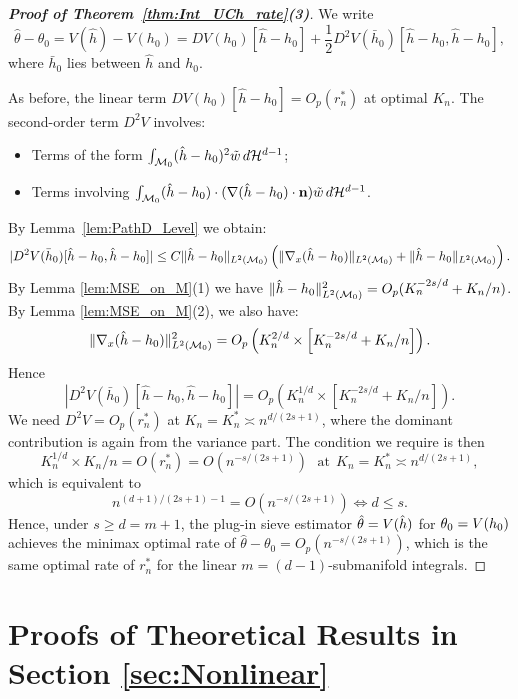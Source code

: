 \documentclass[12pt,american]{article}
\newcommand{\cH}{\mathcal{H}}
\theoremstyle{definition}
\theoremstyle{plain}
\theoremstyle{definition}
\theoremstyle{plain}
\theoremstyle{plain}
\theoremstyle{plain}
\theoremstyle{plain}
\theoremstyle{plain}
\begin{document}
\begin{proof}[\textbf{Proof of Theorem~\ref{thm:Int_UCh_rate}(3)}] We write
\begin{equation}
\hat{\theta} - \theta_0 = V(\hat{h}) - V(h_0) = DV(h_0)[\hat{h} - h_0] + \frac{1}{2}D^2V(\bar{h}_0)[\hat{h} - h_0, \hat{h} - h_0], \label{eq:V_plugin}
\end{equation}
where $\bar{h}_0$ lies between $\hat{h}$ and $h_0$.

As before, the linear term $DV(h_0)[\hat{h} - h_0] = O_p(r_n^*)$ at optimal $K_n$. The second-order term $D^2V$ involves:
\begin{itemize}
    \item Terms of the form $\int_{\cM_0} (\hat{h} - h_0)^2 \tilde{w}\,d\cH^{d-1}$;
    \item Terms involving $\int_{\cM_0}(\hat{h} - h_0) \cdot (\nabla(\hat{h} - h_0) \cdot \mathbf{n})\tilde{w}\,d\cH^{d-1}$.
\end{itemize}
By Lemma~\ref{lem:PathD_Level} we obtain:
\[
|D^2V(\bar{h}_0)[\hat{h} - h_0, \hat{h} - h_0]| \le C\|\hat{h} - h_0\|_{L^2(\mathcal{M}_0)} \left(\|\nabla_x(\hat{h} - h_0)\|_{L^2(\mathcal{M}_0)} + \|\hat{h} - h_0\|_{L^2(\mathcal{M}_0)}\right).
\]
By Lemma \ref{lem:MSE_on_M}(1) we have $\|\hat{h} - h_0\|_{L^2(\mathcal{M}_0)}^2 = O_p(K_n^{-2s/d} + K_n/n)$. By Lemma \ref{lem:MSE_on_M}(2), we also have:
\[
\|\nabla_x(\hat{h} - h_0)\|_{L^2(\mathcal{M}_0)}^2 = O_p\left(K_n^{2/d}\times \left[K_n^{-2s/d} + K_n/n\right]\right).
\]
Hence
\begin{equation}\label{D2V}
|D^2V(\bar{h}_0)[\hat{h} - h_0, \hat{h} - h_0]| = O_p\left(K_n^{1/d}\times \left[K_n^{-2s/d} + K_n/n\right]\right).
\end{equation}
We need $D^2V = O_p(r_n^*)$ at $K_n=K^*_n \asymp n^{d/(2s+1)}$, where the dominant contribution is again from the variance part. The condition we require is then
\[
K_n^{1/d} \times K_n/n  = O(r_n^*) = O(n^{-s/(2s+1)})~~~\text{at}~~K_n=K^*_n \asymp n^{d/(2s+1)},
\]
which is equivalent to
\[
n^{(d+1)/(2s+1) - 1} = O(n^{-s/(2s+1)})  \iff d \leq s.
\]
Hence, under $s \ge d = m + 1$, the plug-in sieve estimator $\hat{\theta}=V(\hat{h})$ for $\theta_0=V(h_0)$ achieves the minimax optimal rate of $\hat{\theta} - \theta_0 = O_p(n^{-s/(2s+1)})$, which is the same optimal rate of $r^*_n$ for the linear $m=(d-1)$-submanifold integrals.
\end{proof}

\section{\label{sec:MainProofs_NL}Proofs of Theoretical Results in Section \ref{sec:Nonlinear}}
\end{document}
